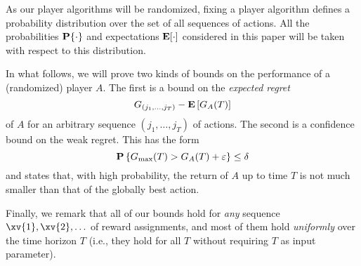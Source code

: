 \documentclass[12pt]{article}
\newcommand{\E}{\mbox{\rm\bf E}}
\renewcommand{\P}{{\bf P}}
\newcommand{\ve}{\varepsilon}
\newcommand{\Gbest}{G_{\rm max}}
\begin{document}
As our player algorithms will be randomized, fixing a player algorithm
defines a probability distribution over the set of all sequences of actions.
All the probabilities $\P\{\cdot\}$ and expectations $\E[\cdot]$ considered
in this paper will be taken with respect to this distribution.

In what follows, we will prove two kinds of bounds on the performance of a
(randomized) player $A$. The first is a bound on the {\em expected regret}
\[
        G_{(j_1,\ldots,j_T)} - \E\left[G_A(T)\right]
\]
of $A$ for an arbitrary sequence $(j_1,\ldots,j_T)$ of actions.
The second is a confidence bound on the weak regret. This has the form
\[
        \P\left\{ \Gbest(T) > G_A(T) + \ve \right\} \leq \delta
\]
and states that, with high probability, the return of $A$ up to time $T$ is not
much smaller than that of the globally best action.

Finally, we remark that all of our bounds hold for {\em any} sequence
$\xv{1},\xv{2},\ldots$ of reward assignments, and most of them hold
{\em uniformly} over the time horizon $T$ (i.e., they hold for all $T$ without
requiring $T$ as input parameter).

\newlength{\colwidth}
\setlength{\colwidth}{\textwidth}
\newlength{\alglength}
\setlength{\alglength}{\colwidth}
\addtolength{\alglength}{-3ex}
\newcommand{\algorithm}[1]{%
\framebox[\colwidth]{%
\begin{minipage}{\alglength}
\hspace*{1mm}\\[2ex]
#1
\hspace*{1mm}
\end{minipage}}}
\end{document}
